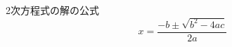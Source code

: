\documentclass{ltjsarticle}
\begin{document}
2次方程式の解の公式
\begin{equation}
x = \frac{-b \pm \sqrt{b^2 - 4ac}}{2a}
\label{eq:quad_sol}
\end{equation}
\end{document}
